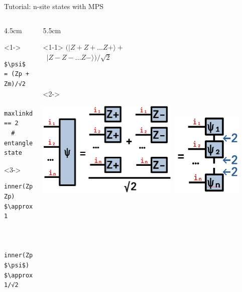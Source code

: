 \begin{frame}[fragile]{Tutorial: n-site states with MPS}

\begin{columns}

\begin{column}{4.5cm}

\begin{onlyenv}<1->
\begin{lstlisting}[language=JuliaLocal, style=julia, mathescape, basicstyle=\scriptsize\ttfamily]
$\psi$ = (Zp + Zm)/√2


maxlinkdim($\psi$) == 2
  # entangled state
\end{lstlisting}
\end{onlyenv}

\begin{onlyenv}<3->
~\\
\begin{lstlisting}[language=JuliaLocal, style=julia, mathescape, basicstyle=\scriptsize\ttfamily]
  inner(Zp, Zp) $\approx$ 1


  inner(Zp, $\psi$) $\approx$ 1/√2
\end{lstlisting}
\end{onlyenv}

\end{column}

\begin{column}{5.5cm}

\begin{onlyenv}<1-1>
$(|Z+Z+\dots Z+\rangle +$ \\
\  $|Z-Z-\dots Z-\rangle)/\sqrt{2}$ \\
~\\
~\\
\end{onlyenv}

\begin{onlyenv}<2->
\begin{center}
\includegraphics[width=0.6\textwidth]{
  slides/assets/catn.png
}
\includegraphics[width=0.3\textwidth]{
  slides/assets/catn_mps.png
}
\end{center}
\end{onlyenv}


\end{column}
\end{columns}
\end{frame}
